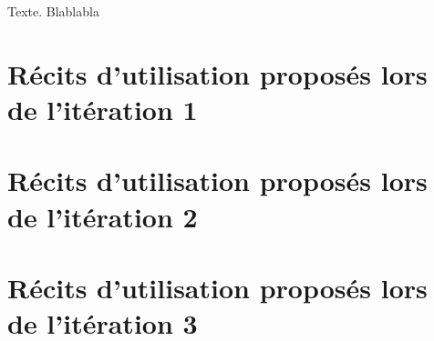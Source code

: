 \documentclass[12pt,a4paper,titlepage,openany, oneside]{report}
\begin{document}
    \renewcommand\rmdefault{pag}
    \selectfont
    \renewcommand{\sfdefault}{pag}

    \renewcommand{\contentsname}{Sommaire}
    \tableofcontents

    \Large
    Texte. Blablabla

    \chapter{Récits d'utilisation proposés lors de l'itération 1}

    \small
    
    \newpage
    
    \newpage
    
    \newpage
    
    \newpage
    
    \newpage
    
    \newpage
    
    \newpage
    
    \newpage
    
    \newpage
    
    \newpage
    

    \chapter{Récits d'utilisation proposés lors de l'itération 2}
    \chapter{Récits d'utilisation proposés lors de l'itération 3}
\end{document}
